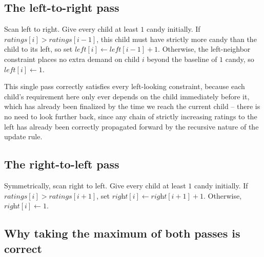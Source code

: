 \subsection*{The left-to-right pass}

\begin{ideabox}
Scan left to right. Give every child at least $1$ candy initially. If
$\textit{ratings}[i] > \textit{ratings}[i-1]$, this child must have strictly
more candy than the child to its left, so set $\textit{left}[i] \gets
\textit{left}[i-1] + 1$. Otherwise, the left-neighbor constraint places no
extra demand on child $i$ beyond the baseline of $1$ candy, so
$\textit{left}[i] \gets 1$.
\end{ideabox}

This single pass correctly satisfies every left-looking constraint, because
each child's requirement here only ever depends on the child immediately
before it, which has already been finalized by the time we reach the
current child -- there is no need to look further back, since any chain of
strictly increasing ratings to the left has already been correctly
propagated forward by the recursive nature of the update rule.

\subsection*{The right-to-left pass}

\begin{ideabox}
Symmetrically, scan right to left. Give every child at least $1$ candy
initially. If $\textit{ratings}[i] > \textit{ratings}[i+1]$, set
$\textit{right}[i] \gets \textit{right}[i+1] + 1$. Otherwise,
$\textit{right}[i] \gets 1$.
\end{ideabox}

\subsection*{Why taking the maximum of both passes is correct}

